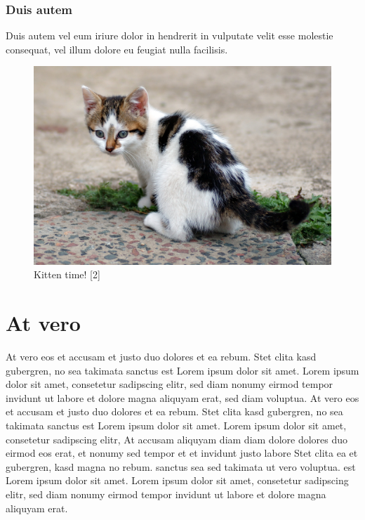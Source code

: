 \documentclass[12pt,twocolumn]{article}
\begin{document}
\subsubsection{Duis autem}\label{duis-autem-1}

Duis autem vel eum iriure dolor in hendrerit in vulputate velit esse
molestie consequat, vel illum dolore eu feugiat nulla facilisis.

\begin{figure}[htbp]
\centering
\includegraphics{images/kitten.jpg}
\caption{Kitten time! {[}2{]}}
\end{figure}

\section{At vero}\label{at-vero}

At vero eos et accusam et justo duo dolores et ea rebum. Stet clita kasd
gubergren, no sea takimata sanctus est Lorem ipsum dolor sit amet. Lorem
ipsum dolor sit amet, consetetur sadipscing elitr, sed diam nonumy
eirmod tempor invidunt ut labore et dolore magna aliquyam erat, sed diam
voluptua. At vero eos et accusam et justo duo dolores et ea rebum. Stet
clita kasd gubergren, no sea takimata sanctus est Lorem ipsum dolor sit
amet. Lorem ipsum dolor sit amet, consetetur sadipscing elitr, At
accusam aliquyam diam diam dolore dolores duo eirmod eos erat, et nonumy
sed tempor et et invidunt justo labore Stet clita ea et gubergren, kasd
magna no rebum. sanctus sea sed takimata ut vero voluptua. est Lorem
ipsum dolor sit amet. Lorem ipsum dolor sit amet, consetetur sadipscing
elitr, sed diam nonumy eirmod tempor invidunt ut labore et dolore magna
aliquyam erat.
\end{document}
